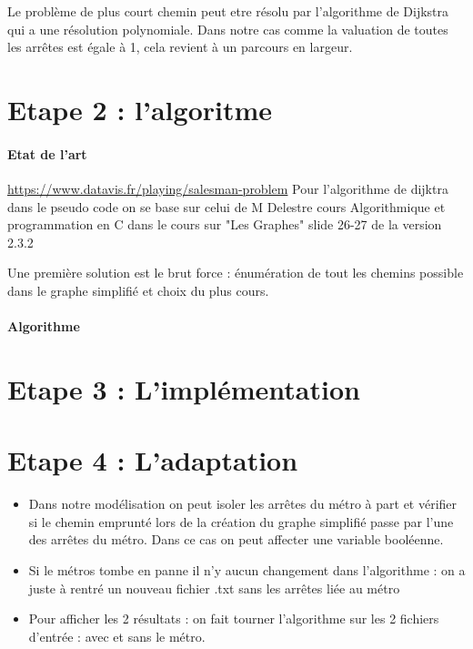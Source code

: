 \documentclass[11pt,a4paper]{article}
\begin{document}
\begin{itemize}
    Le problème de plus court chemin peut etre résolu par l'algorithme de Dijkstra qui a une résolution polynomiale. Dans notre cas comme la valuation de toutes les arrêtes est égale à 1, cela revient à un parcours en largeur.
\end{itemize}
\section{Etape 2 : l'algoritme}
\paragraph{Etat de l'art}
\url{https://www.datavis.fr/playing/salesman-problem}
Pour l'algorithme de dijktra dans le pseudo code on se base sur celui de M Delestre cours Algorithmique et programmation en C dans le cours sur "Les Graphes" slide 26-27 de la version 2.3.2

Une première solution est le brut force : énumération de tout les chemins possible dans le graphe simplifié et choix du plus cours.
\paragraph{Algorithme}

\section{Etape 3 : L'implémentation}
\section{Etape 4 : L'adaptation}
\begin{itemize}
    \item Dans notre modélisation on peut isoler les arrêtes du métro à part et vérifier si le chemin emprunté lors de la création du graphe simplifié passe par l'une des arrêtes du métro. 
    Dans ce cas on peut affecter une variable booléenne.
    \item Si le métros tombe en panne il n'y aucun changement dans l'algorithme : on a juste à rentré un nouveau fichier .txt sans les arrêtes liée au métro
    \item Pour afficher les 2 résultats : on fait tourner l'algorithme sur les 2 fichiers d'entrée : avec et sans le métro.
\end{itemize}
\end{document}
